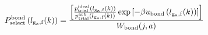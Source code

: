\documentclass[12pt]{article}
\begin{document}
\begin{displaymath}
P_{\rm select}^{\rm bond}\left(l_{\rm g_a,f}(k)\right) = 
{{
\left[
{{p_{\rm trial}^{\rm ideal}\left(l_{\rm g_a,f}(k)\right)}\over{ p_{\rm trial}^{\rm arb}\left(l_{\rm g_a,f}(k)\right)}}
\exp\left[-\beta u_{\rm bond}\left(l_{\rm g_a,f}(k)\right)\right]
\right]
}
\over
{
W_{\rm bond}(j,a)
}}
\end{displaymath}
\end{document}
